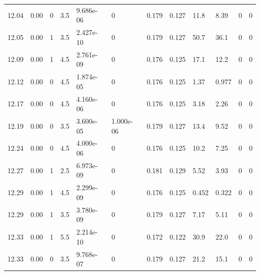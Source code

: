 \documentclass[preview]{standalone}
\begin{document}
{{{{{{{{{{{\begin{tabular}{L{1.2cm}C{1.2cm} C{0.3cm}C{0.5cm} C{1.4cm}C{1.4cm} C{1.4cm}C{1.4cm} C{1.6cm}C{1.6cm} C{1.6cm}C{1.6cm}}
  12.04  &  0.00  & 0     & 3.5 &  9.686e-06  & 0  &  0.179&   0.127& 11.8 & 8.39   &  0 & 0  \\ 
  12.05  &  0.00  & 1     & 3.5 &  2.427e-10  & 0  &  0.179&   0.127& 50.7 & 36.1   &  0 & 0  \\ 
  12.09  &  0.00  & 1     & 4.5 &  2.761e-09  & 0  &  0.176&   0.125& 17.1 & 12.2   &  0 & 0  \\ 
  12.12  &  0.00  & 0     & 4.5 &  1.874e-05  & 0  &  0.176&   0.125& 1.37 & 0.977   &  0 & 0  \\ 
  12.17  &  0.00  & 0     & 4.5 &  4.160e-06  & 0  &  0.176&   0.125& 3.18 & 2.26   &  0 & 0  \\ 
  12.19  &  0.00  & 0     & 3.5 &  3.600e-05  & 1.000e-06  &  0.179&   0.127& 13.4 & 9.52   &  0 & 0  \\ 
  12.24  &  0.00  & 0     & 4.5 &  4.000e-06  & 0  &  0.176&   0.125& 10.2 & 7.25   &  0 & 0  \\ 
  12.27  &  0.00  & 1     & 2.5 &  6.973e-09  & 0  &  0.181&   0.129& 5.52 & 3.93   &  0 & 0  \\ 
  12.29  &  0.00  & 1     & 4.5 &  2.299e-09  & 0  &  0.176&   0.125& 0.452 & 0.322   &  0 & 0  \\ 
  12.29  &  0.00  & 1     & 3.5 &  3.780e-09  & 0  &  0.179&   0.127& 7.17 & 5.11   &  0 & 0  \\ 
  12.33  &  0.00  & 1     & 5.5 &  2.214e-10  & 0  &  0.172&   0.122& 30.9 & 22.0   &  0 & 0  \\ 
  12.33  &  0.00  & 0     & 3.5 &  9.768e-07  & 0  &  0.179&   0.127& 21.2 & 15.1   &  0 & 0  \\ 
\hline 
\end{tabular} 

}}}}}}}}}}}
\end{document}
